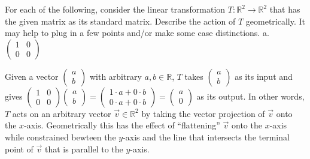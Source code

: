 \documentclass[12pt]{article}
\newenvironment{problem}[2][Problem]
{
	\begin{trivlist} 
		\item[\hskip \labelsep {\bfseries #1 #2:}]
	}
{
	\end{trivlist}
	}
\newenvironment{solution}[1][Solution]
{
	\begin{trivlist} 
		\item[\hskip \labelsep {\itshape #1:}]
	}
	{
	\end{trivlist}
}
\begin{document}
\newpage
\begin{problem}{4}
For each of the following, consider the linear transformation $T: \mathbb{R}^2 \to \mathbb{R}^2$ that has the given matrix as its standard matrix. Describe the action of $T$ geometrically. It may help to plug in a few points and/or make some case distinctions.
\noindent
\newline
\newline
a. $\begin{pmatrix}1&0\\0&0\end{pmatrix}$
\begin{solution}
Given a vector $\begin{pmatrix}a\\b\end{pmatrix}$ with arbitrary $a,b \in \mathbb{R}$, $T$ takes $\begin{pmatrix}a\\b\end{pmatrix}$ as its input and gives $\begin{pmatrix}1&0\\0 & 0\end{pmatrix} \begin{pmatrix}a\\b\end{pmatrix}=\begin{pmatrix}1\cdot a+ 0\cdot b\\0\cdot a+0\cdot b\end{pmatrix} = \begin{pmatrix}a\\0\end{pmatrix}$ as its output. In other words, $T$ acts on an arbitrary vector $\vec{v} \in \mathbb{R}^2$ by taking the vector projection of $\vec{v}$ onto the $x$-axis. Geometrically this has the effect of ``flattening'' $\vec{v}$ onto the $x$-axis while constrained bewteen the $y$-axis and the line that intersects the terminal point of $\vec{v}$ that is parallel to the $y$-axis.
\end{solution}


\end{problem}
\end{document}
